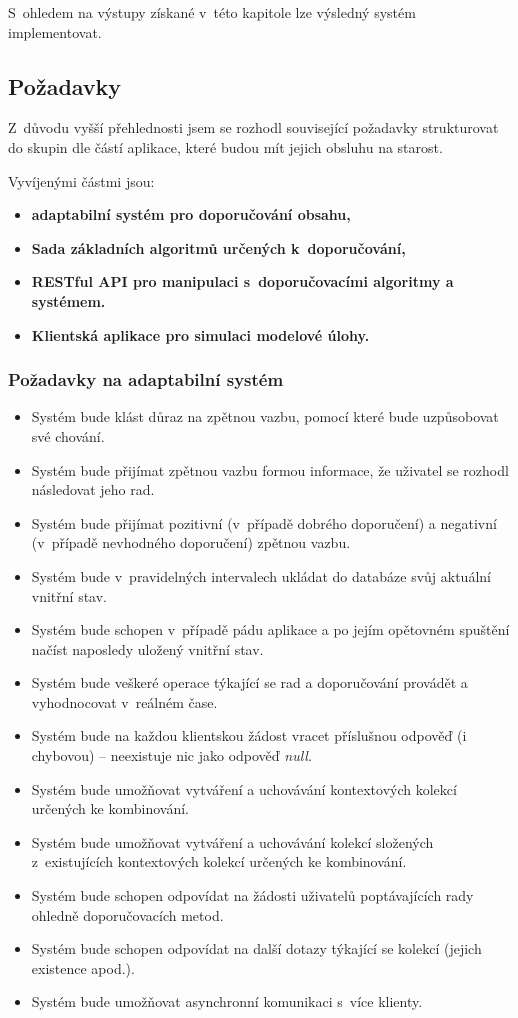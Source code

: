 \documentclass[thesis=M,czech]{FITthesis}[2014/05/07]
\begin{document}
S~ohledem na výstupy získané v~této kapitole lze výsledný systém implementovat.

\subsection{Požadavky}
\label{sec:req}
Z~důvodu vyšší přehlednosti jsem se rozhodl související požadavky strukturovat do skupin dle částí aplikace, které budou mít jejich obsluhu na starost.

Vyvíjenými částmi jsou:

\begin{itemize}
  \item \textbf{adaptabilní systém pro doporučování obsahu,}
  \item \textbf{Sada základních algoritmů určených k~doporučování,}
  \item \textbf{RESTful API pro manipulaci s~doporučovacími algoritmy a systémem.}
  \item \textbf{Klientská aplikace pro simulaci modelové úlohy.}    
\end{itemize}

\subsubsection{Požadavky na adaptabilní systém}

\begin{itemize}
	\item Systém bude klást důraz na zpětnou vazbu, pomocí které bude uzpůsobovat své chování.
	\item Systém bude přijímat zpětnou vazbu formou informace, že uživatel se rozhodl následovat jeho rad.
	\item Systém bude přijímat pozitivní (v~případě dobrého doporučení) a negativní (v~případě nevhodného doporučení) zpětnou vazbu.
	\item Systém bude v~pravidelných intervalech ukládat do databáze svůj aktuální vnitřní stav.
	\item Systém bude schopen v~případě pádu aplikace a po jejím opětovném spuštění načíst naposledy uložený vnitřní stav.
	\item Systém bude veškeré operace týkající se rad a doporučování provádět a vyhodnocovat v~reálném čase.
	\item Systém bude na každou klientskou žádost vracet příslušnou odpověď (i chybovou) – neexistuje nic jako odpověď \emph{null}.	
	\item Systém bude umožňovat vytváření a uchovávání kontextových kolekcí určených ke kombinování.
	\item Systém bude umožňovat vytváření a uchovávání kolekcí složených z~existujících kontextových kolekcí určených ke kombinování.	
	\item Systém bude schopen odpovídat na žádosti uživatelů poptávajících rady ohledně doporučovacích metod.
	\item Systém bude schopen odpovídat na další dotazy týkající se kolekcí (jejich existence apod.).	
	\item Systém bude umožňovat asynchronní komunikaci s~více klienty.
\end{itemize}
\end{document}

